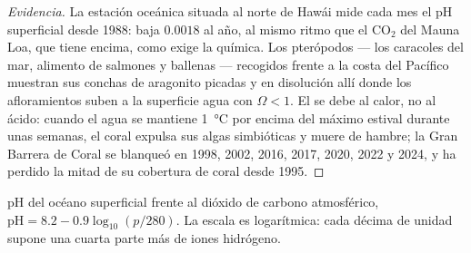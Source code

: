 \begin{proof}[Evidencia]
La estación oceánica situada al norte de Hawái mide cada mes el pH
superficial desde 1988: baja $0.0018$ al año, al mismo ritmo que el
\ensuremath{\mathrm{CO_2}} del Mauna Loa, que tiene encima, como exige la química.
Los pterópodos --- los caracoles del mar, alimento de salmones y ballenas
--- recogidos frente a la costa del Pacífico muestran sus conchas de
aragonito picadas y en disolución allí donde los afloramientos suben a la
superficie agua con $\Omega <
1$. El  se debe al calor, no al ácido: cuando el
agua se mantiene \qty{1}{\celsius} por encima del máximo estival durante
unas semanas, el coral expulsa sus algas simbióticas y muere de hambre; la
Gran Barrera de Coral se blanqueó en 1998, 2002, 2016, 2017, 2020, 2022 y
2024, y ha perdido la mitad de su cobertura de coral desde 1995.
\end{proof}
\begin{omfigure}

{\small pH del océano superficial frente al dióxido de carbono
atmosférico,
$\mathrm{pH} = 8.2 - 0.9\log_{10}(p/280)$. La escala es logarítmica: cada
décima de unidad supone una cuarta parte más de iones hidrógeno.}
\end{omfigure}

